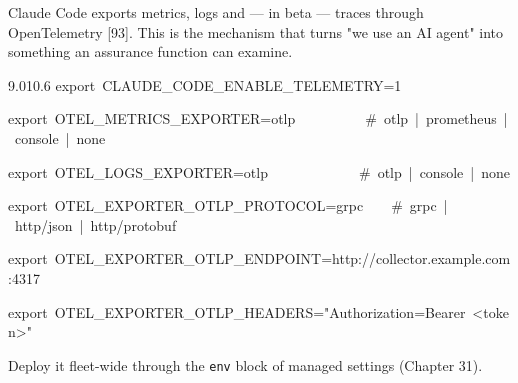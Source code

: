 \documentclass[11pt,a4paper,twoside,openany]{book}
\newcommand{\cl}[1]{\noindent\mbox{#1}\par}
\begin{document}
Claude Code exports metrics, logs and — in beta — traces through OpenTelemetry [93]. This is the mechanism that turns "we use an AI agent" into something an assurance function can examine.


\begin{codeblock}{9.0}{10.6}
\cl{export~CLAUDE\_CODE\_ENABLE\_TELEMETRY=1}
\cl{export~OTEL\_METRICS\_EXPORTER=otlp~~~~~~~~~~\#~otlp~|~prometheus~|~console~|~none}
\cl{export~OTEL\_LOGS\_EXPORTER=otlp~~~~~~~~~~~~~\#~otlp~|~console~|~none}
\cl{export~OTEL\_EXPORTER\_OTLP\_PROTOCOL=grpc~~~~\#~grpc~|~http/json~|~http/protobuf}
\cl{export~OTEL\_EXPORTER\_OTLP\_ENDPOINT=http://collector.example.com:4317}
\cl{export~OTEL\_EXPORTER\_OTLP\_HEADERS="Authorization=Bearer~<token>"}
\end{codeblock}

Deploy it fleet-wide through the \texttt{env} block of managed settings (Chapter 31).
\end{document}
